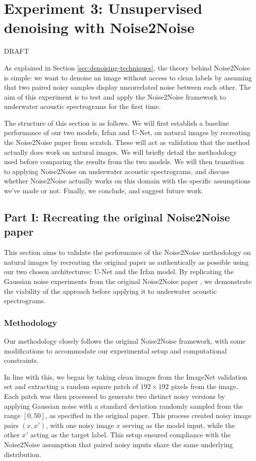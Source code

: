 \newpage
\section{Experiment 3: Unsupervised denoising with Noise2Noise}

DRAFT 

As explained in Section \ref{sec:denoising-techniques}, the theory behind Noise2Noise is simple: we want to denoise an image without access to clean labels by assuming that two paired noisy samples display uncorrelated noise between each other. The aim of this experiment is to test and apply the Noise2Noise framework to underwater acoustic spectrograms for the first time. 

The structure of this section is as follows. We will first establish a baseline performance of our two models, Irfan and U-Net, on natural images by recreating the Noise2Noise paper from scratch. These will act as validation that the method actually does work on natural images. We will briefly detail the methodology used before comparing the results from the two models. We will then transition to applying Noise2Noise on underwater acoustic spectrograms, and discuss whether Noise2Noise actually works on this domain with the specific assumptions we've made or not. Finally, we conclude, and suggest future work.

\subsection{Part I: Recreating the original Noise2Noise paper}

This section aims to validate the performance of the Noise2Noise methodology on natural images by recreating the original paper as authentically as possible using our two chosen architectures: U-Net and the Irfan model. By replicating the Gaussian noise experiments from the original Noise2Noise paper \cite{lehtinen_noise2noise_2018}, we demonstrate the viability of the approach before applying it to underwater acoustic spectrograms.

\subsubsection{Methodology}

Our methodology closely follows the original Noise2Noise framework, with some modifications to accommodate our experimental setup and computational constraints. 

In line with this, we began by taking clean images from the ImageNet validation set and extracting a random square patch of $192 \times 192$ pixels from the image. Each patch was then processed to generate two distinct noisy versions by applying Gaussian noise with a standard deviation randomly sampled from the range $[0, 50]$, as specified in the original paper. This process created noisy image pairs $(x, x')$, with one noisy image $x$ serving as the model input, while the other $x'$ acting as the target label. This setup ensured compliance with the Noise2Noise assumption that paired noisy inputs share the same underlying distribution.

